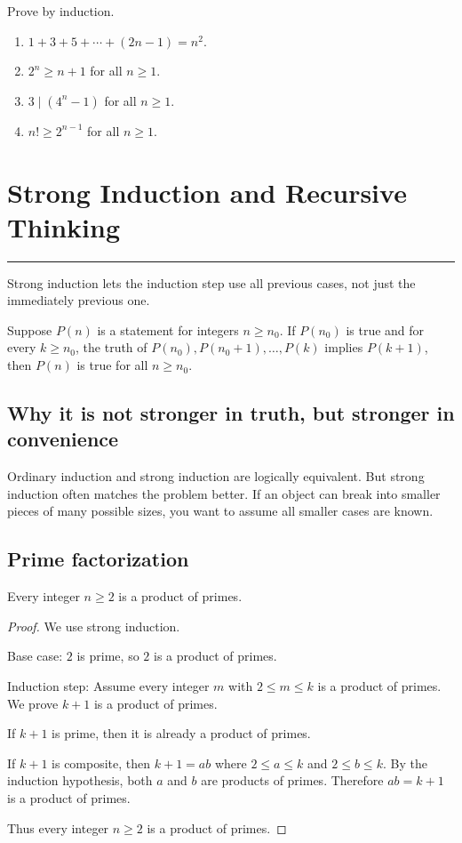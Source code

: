 \documentclass[12pt]{article}
\newcommand{\chapterline}{\vspace{0.4em}\hrule\vspace{0.8em}}
\begin{document}
Prove by induction.

\begin{enumerate}
\item $1+3+5+\cdots+(2n-1)=n^2$.
\item $2^n\geq n+1$ for all $n\geq1$.
\item $3\mid(4^n-1)$ for all $n\geq1$.
\item $n! \geq 2^{n-1}$ for all $n\geq1$.
\end{enumerate}

\newpage
\section{Strong Induction and Recursive Thinking}
\chapterline

Strong induction lets the induction step use all previous cases, not just the immediately previous one.

\begin{theorem}
Suppose $P(n)$ is a statement for integers $n\geq n_0$. If $P(n_0)$ is true and for every $k\geq n_0$, the truth of $P(n_0),P(n_0+1),\ldots,P(k)$ implies $P(k+1)$, then $P(n)$ is true for all $n\geq n_0$.
\end{theorem}

\subsection{Why it is not stronger in truth, but stronger in convenience}

Ordinary induction and strong induction are logically equivalent. But strong induction often matches the problem better. If an object can break into smaller pieces of many possible sizes, you want to assume all smaller cases are known.

\subsection{Prime factorization}

\begin{theorem}
Every integer $n\geq2$ is a product of primes.
\end{theorem}

\begin{proof}
We use strong induction.

Base case: $2$ is prime, so $2$ is a product of primes.

Induction step: Assume every integer $m$ with $2\leq m\leq k$ is a product of primes. We prove $k+1$ is a product of primes.

If $k+1$ is prime, then it is already a product of primes.

If $k+1$ is composite, then $k+1=ab$ where $2\leq a\leq k$ and $2\leq b\leq k$. By the induction hypothesis, both $a$ and $b$ are products of primes. Therefore $ab=k+1$ is a product of primes.

Thus every integer $n\geq2$ is a product of primes.
\end{proof}
\end{document}
